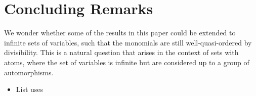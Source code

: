 \section{Concluding Remarks}
\label{sec:conclusion}


We wonder whether some of the results in this paper could be extended to
infinite sets of variables, such that the monomials are still
well-quasi-ordered by divisibility. This is a natural question that arises in
the context of sets with atoms, where the set of variables is infinite but are
considered up to a group of automorphisms.

\begin{itemize}
  \item List uses 
\end{itemize}

